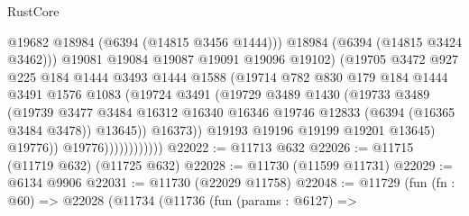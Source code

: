\begin{lexlean}{RustCore}
\begin{coremodule}
                                    @19682
                                    @18984
                                    (@6394 (@14815 @3456 @1444)))
                                  @18984
                                  (@6394 (@14815 @3424 @3462)))
                                @19081
                                @19084
                                @19087
                                @19091
                                @19096
                                @19102)
                              (@19705
                                @3472
                                @927
                                @225
                                @184
                                @1444
                                @3493
                                @1444
                                @1588
                                (@19714
                                  @782
                                  @830
                                  @179
                                  @184
                                  @1444
                                  @3491
                                  @1576
                                  @1083
                                  (@19724
                                    @3491
                                    (@19729
                                      @3489
                                      @1430
                                      (@19733
                                        @3489
                                        (@19739
                                          @3477
                                          @3484
                                          @16312
                                          @16340
                                          @16346
                                          @19746
                                          @12833
                                          (@6394 (@16365 @3484 @3478))
                                          @13645))
                                      @16373))
                                  @19193
                                  @19196
                                  @19199
                                  @19201
                                  @13645)
                                @19776))
                            @19776))))))))))))
@22022 := @11713 @632
@22026 := @11715 (@11719 @632) (@11725 @632)
@22028 := @11730 (@11599 @11731)
@22029 := @6134 @9906
@22031 := @11730 (@22029 @11758)
@22048 := @11729
    (fun (fn : @60) =>
    @22028
      (@11734
        (@11736
          (fun (params : @6127) =>

\end{coremodule}
\end{lexlean}
